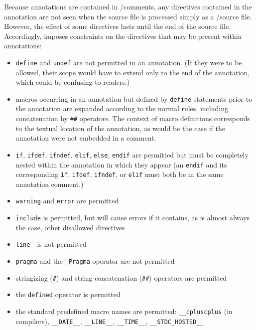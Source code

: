 Because \acslb annotations are contained in \C/\cpp comments,
any directives contained in the annotation are not seen when the source file is processed simply as a \C/\cpp source file. However, the effect of some directives lasts until the end of the source file. 
Accordingly, \acslpp imposes constraints on the directives that may be present within annotations:
\begin{itemize}
        \item \texttt{define} and \texttt{undef} are not permitted in an annotation. (If they were to be allowed, their scope would have to extend only to the end of the annotation, which could be confusing to readers.)
        \item macros occurring in an annotation but defined by \texttt{define} statements prior to the annotation are expanded according to the normal rules, including concatenation by \texttt{\#\#} operators.
        The context of macro definitions corresponds to the textual location of the annotation, as would be the case if the
        annotation were not embedded in a comment.
        \item \texttt{if}, \texttt{ifdef}, \texttt{ifndef}, \texttt{elif}, \texttt{else}, \texttt{endif} are permitted but must be completely nested within the annotation in which they appear (an \texttt{endif} and its corresponding \texttt{if}, \texttt{ifdef}, \texttt{ifndef}, or \texttt{elif} must both be in the same annotation comment.)
        \item \texttt{warning} and \texttt{error} are permitted
        \item \texttt{include} is permitted, but will cause errors if it contains, as is almost always the case, other disallowed directives
        \item \texttt{line} - is not permitted
        \item \texttt{pragma} and the \texttt{\_Pragma} operator are not permitted
        \item stringizing (\verb|#|) and string concatenation (\verb|##|) operators are permitted
        \item the \verb|defined| operator is permitted
        \item the standard predefined macro names are permitted:
        \texttt{\_\_cpluscplus} (in \cpp compilers),
        \texttt{\_\_DATE\_\_},
        \texttt{\_\_LINE\_\_},
    \texttt{\_\_TIME\_\_},
        \texttt{\_\_STDC\_HOSTED\_\_}
\end{itemize}

